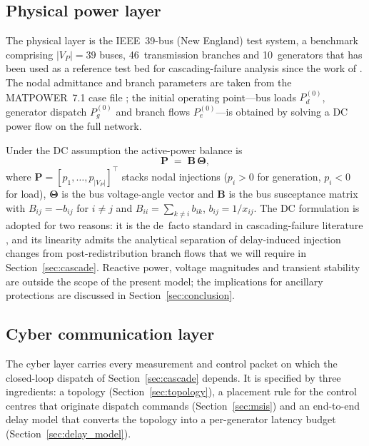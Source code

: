 \subsection{Physical power layer}\label{sec:power}

The physical layer is the IEEE~39-bus (New England) test system, a
benchmark comprising $|V_P|=39$ buses, 46~transmission branches and
10~generators that has been used as a reference test bed for
cascading-failure analysis since the work of \citet{Athay1979}.  The
nodal admittance and branch parameters are taken from the
MATPOWER~7.1 case file \citep{Zimmerman2011matpower}; the initial
operating point---bus loads $P_d^{(0)}$, generator dispatch
$P_g^{(0)}$ and branch flows $P_e^{(0)}$---is obtained by solving a
DC power flow on the full network.

Under the DC assumption the active-power balance is
\begin{equation}\label{eq:dcpf}
  \mathbf{P} \;=\; \mathbf{B}\,\boldsymbol{\Theta},
\end{equation}
where $\mathbf{P}=[p_1,\dots,p_{|V_P|}]^{\!\top}$ stacks nodal
injections ($p_i>0$ for generation, $p_i<0$ for load),
$\boldsymbol{\Theta}$ is the bus voltage-angle vector and
$\mathbf{B}$ is the bus susceptance matrix with
$B_{ij}=-b_{ij}$ for $i\ne j$ and
$B_{ii}=\sum_{k\ne i}b_{ik}$, $b_{ij}=1/x_{ij}$.  The DC formulation is
adopted for two reasons: it is the de~facto standard in cascading-failure
literature \citep{Dobson2007,Brummitt2012}, and its linearity admits
the analytical separation of delay-induced injection changes from
post-redistribution branch flows that we will require in
Section~\ref{sec:cascade}.  Reactive power, voltage magnitudes and
transient stability are outside the scope of the present model; the
implications for ancillary protections are discussed in
Section~\ref{sec:conclusion}.

\subsection{Cyber communication layer}\label{sec:cyber}

The cyber layer carries every measurement and control packet on which
the closed-loop dispatch of Section~\ref{sec:cascade} depends.  It is
specified by three ingredients: a topology
(Section~\ref{sec:topology}), a placement rule for the control
centres that originate dispatch commands (Section~\ref{sec:msis})
and an end-to-end delay model that converts the topology into a
per-generator latency budget (Section~\ref{sec:delay_model}).

